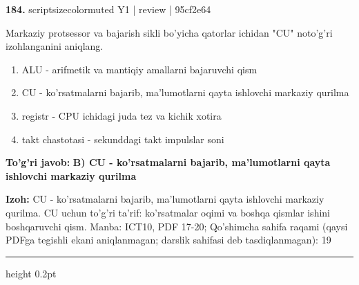 \documentclass[10pt,a4paper]{article}
\begin{document}
{\bfseries\sffamily\color{ink} 184.} {scriptsizecolor{muted} Y1 | review | 95cf2e64}
\par
Markaziy protsessor va bajarish sikli bo'yicha qatorlar ichidan "CU" noto'g'ri izohlanganini aniqlang.
\begin{enumerate}[label=\Alph*),leftmargin=9mm]
\item ALU - arifmetik va mantiqiy amallarni bajaruvchi qism
\item CU - ko'rsatmalarni bajarib, ma'lumotlarni qayta ishlovchi markaziy qurilma
\item registr - CPU ichidagi juda tez va kichik xotira
\item takt chastotasi - sekunddagi takt impulslar soni
\end{enumerate}
\begin{tcolorbox}[enhanced,breakable,colback=teal!4,colframe=teal!60!black,boxrule=0.45pt,arc=1.2mm,left=2.7mm,right=2.7mm,top=1.8mm,bottom=1.8mm,before skip=2mm,after skip=2mm]
{\bfseries\sffamily\color{teal}To'g'ri javob:} \textbf{B) CU - ko'rsatmalarni bajarib, ma'lumotlarni qayta ishlovchi markaziy qurilma}
\par\smallskip
{\bfseries Izoh:} CU - ko'rsatmalarni bajarib, ma'lumotlarni qayta ishlovchi markaziy qurilma. CU uchun to'g'ri ta'rif: ko'rsatmalar oqimi va boshqa qismlar ishini boshqaruvchi qism. Manba: ICT10, PDF 17-20; Qo'shimcha sahifa raqami (qaysi PDFga tegishli ekani aniqlanmagan; darslik sahifasi deb tasdiqlanmagan): 19
\end{tcolorbox}
\vspace{2mm}\hrule height 0.2pt\vspace{3mm}
\end{document}
